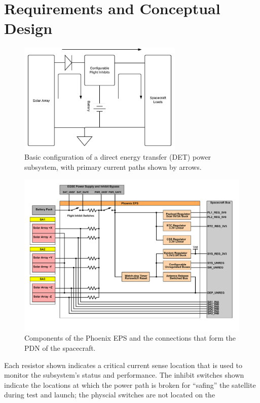 \section{Requirements and Conceptual Design}\label{Sect:eps_concept}

\begin{figure}[htbp]
	\centering
	\includegraphics[width=0.7\textwidth]{../figs/phoenix/concept/eps_basic.pdf}
	\caption{Basic configuration of a direct energy transfer (DET) power subsystem, with primary current paths shown by arrows.}
	\label{fig:eps_basic}
\end{figure}

\begin{figure}[htbp]
	\centering
	\includegraphics[width=\textwidth]{../figs/phoenix/concept/system_diagram.pdf}
	\caption{Components of the Phoenix EPS and the connections that form the PDN of the spacecraft.}
	\label{fig:eps_block}
\end{figure}

Each resistor shown indicates a critical current sense location that is used to monitor the subsystem's status and performance. The inhibit switches shown indicate the locations at which the power path is broken for ``safing'' the satellite during test and launch; the physcial switches are not located on the

